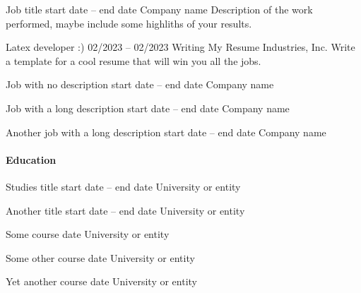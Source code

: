 \documentclass[color]{resume-twopanels}
\begin{document}
\begin{resume}
\begin{rightpanel}
\begin{itemize}
                \resumeitem
                {Job title}
                {start date – end date}
                {Company name}
                {Description of the work performed,
                maybe include some highliths of your results.}

                \resumeitem
                {Latex developer :)}
                {02/2023 – 02/2023}
                {Writing My Resume Industries, Inc.}
                {Write a template for a cool resume
                that will win you all the jobs.}

                \resumeitem
                {Job with no description}
                {start date – end date}
                {Company name}
                {}%

                \resumeitem
                {Job with a long description}
                {start date – end date}
                {Company name}
                {\lipsum[66]}

                \resumeitem
                {Another job with a long description}
                {start date – end date}
                {Company name}
                {\lipsum[66]}
            \end{itemize}


        \paragraph{Education}

            \begin{itemize}

                \resumeitem
                {Studies title}
                {start date – end date}
                {University or entity}
                {}

                \resumeitem
                {Another title}
                {start date – end date}
                {University or entity}
                {}
                \vspace{1em}

                \resumeitem
                {Some course}
                {date}
                {University or entity}
                {}

                \resumeitem
                {Some other course}
                {date}
                {University or entity}
                {}

                \resumeitem
                {Yet another course}
                {date}
                {University or entity}
                {}
            \end{itemize}

    \end{rightpanel}
\end{resume}
\end{document}
